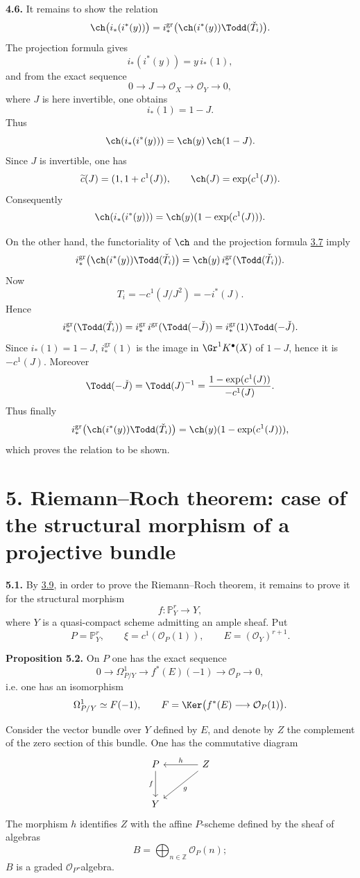 \textbf{4.6.} It remains to show the relation
\[
 \ch\bigl(i_*(i^*(y))\bigr)
 =
 i^{\mathrm{gr}}_*\bigl(\ch(i^*(y))\Todd(\check T_i)\bigr).
\]
The projection formula gives
\[
 i_*(i^*(y))=y\,i_*(1),
\]
and from the exact sequence
\[
0\longrightarrow J\longrightarrow\mathcal O_X\longrightarrow\mathcal O_Y\longrightarrow0,
\]
where \(J\) is here invertible, one obtains
\[
 i_*(1)=1-J.
\]
Thus
\[
 \ch(i_*(i^*(y)))=\ch(y)\,\ch(1-J).
\]
Since \(J\) is invertible, one has
\[
 \widetilde c(J)=(1,1+c^1(J)),\qquad \ch(J)=\exp(c^1(J)).
\]
Consequently
\[
 \ch(i_*(i^*(y)))=\ch(y)(1-\exp(c^1(J))).
\]

On the other hand, the functoriality of \(\ch\) and the projection formula \hyperlink{sga6.e08.prop.3-7}{3.7} imply
\[
 i^{\mathrm{gr}}_*\bigl(\ch(i^*(y))\Todd(\check T_i)\bigr)
 =
 \ch(y)\,i^{\mathrm{gr}}_*(\Todd(\check T_i)).
\]
Now
\[
T_i=-c^1(J/J^2)=-i^*(J).
\]
Hence
\[
 i^{\mathrm{gr}}_*(\Todd(\check T_i))
 =
 i^{\mathrm{gr}}_*\,i^{\mathrm{gr}}(\Todd(-\check J))
 =
 i^{\mathrm{gr}}_*(1)\Todd(-\check J).
\]
Since \(i_*(1)=1-J\), \(i^{\mathrm{gr}}_*(1)\) is the image in \(\Gr^1K^{\bullet}(X)\) of \(1-J\), hence it is \(-c^1(J)\). Moreover
\[
 \Todd(-\check J)=\Todd(J)^{-1}
 =
 \frac{1-\exp(c^1(J))}{-c^1(J)}.
\]
Thus finally
\[
 i^{\mathrm{gr}}_*\bigl(\ch(i^*(y))\Todd(\check T_i)\bigr)
 =
 \ch(y)(1-\exp(c^1(J))),
\]
which proves the relation to be shown.

\section*{5. Riemann--Roch theorem: case of the structural morphism of a projective bundle}

\textbf{5.1.} By \hyperlink{sga6.e08.para.3-9}{3.9}, in order to prove the Riemann--Roch theorem, it remains to prove it for the structural morphism
\[
f:\mathbb P^r_Y\longrightarrow Y,
\]
where \(Y\) is a quasi-compact scheme admitting an ample sheaf. Put
\[
P=\mathbb P^r_Y,\qquad \xi=c^1(\mathcal O_P(1)),\qquad E=(\mathcal O_Y)^{r+1}.
\]

\textbf{Proposition 5.2.} On \(P\) one has the exact sequence
\[
0\longrightarrow\Omega^1_{P/Y}\longrightarrow f^*(E)(-1)\longrightarrow\mathcal O_P\longrightarrow0,
\]
i.e. one has an isomorphism
\[
\Omega^1_{P/Y}\simeq F(-1),
\qquad
F=\Ker\bigl(f^*(E)\longrightarrow\mathcal O_P(1)\bigr).
\]

Consider the vector bundle over \(Y\) defined by \(E\), and denote by \(Z\) the complement of the zero section of this bundle. One has the commutative diagram
\[
\begin{tikzcd}[column sep=large,row sep=large]
P \arrow[d,"f"'] & Z \arrow[l,"h"'] \arrow[dl,"g"]\\
Y &
\end{tikzcd}
\]
The morphism \(h\) identifies \(Z\) with the affine \(P\)-scheme defined by the sheaf of algebras
\[
B=\bigoplus_{n\in\mathbb Z}\mathcal O_P(n);
\]
\(B\) is a graded \(\mathcal O_P\)-algebra.

